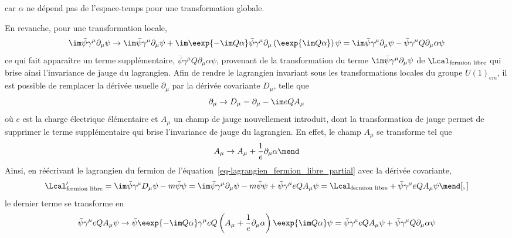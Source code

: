 car $\alpha$ ne dépend pas de l'espace-temps pour une transformation globale.
\par En revanche, pour une transformation locale, %
\begin{equation}
\im\bar{\psi} \gamma^\mu\partial_\mu \psi
\to
\im\bar{\psi} \gamma^\mu\partial_\mu \psi
+
\im\eexp{-\im Q\alpha}
\bar{\psi}
\gamma^\mu
\partial_\mu
\left(\eexp{\im Q\alpha}\vphantom{\psi\eexp{\im Q\alpha}}\right)
\psi
=
\im\bar{\psi} \gamma^\mu\partial_\mu \psi
-
\bar{\psi}
\gamma^\mu
Q\partial_\mu
\alpha
\psi
\label{eq-QED_jauge_brisee}
\end{equation}
ce qui fait apparaître un terme supplémentaire, $\bar{\psi}\gamma^\mu Q\partial_\mu\alpha\psi$, provenant de la transformation du terme $\im \bar{\psi} \gamma^\mu\partial_\mu \psi$ de $\Lcal_{\text{fermion libre}}$ qui brise ainsi l'invariance de jauge du lagrangien.
Afin de rendre le lagrangien invariant sous les transformations locales du groupe $U(1)_{em}$, il est possible de remplacer la dérivée usuelle $\partial_\mu$ par la dérivée covariante $D_\mu$, telle que
\begin{equation}
\partial_\mu \to D_\mu = \partial_\mu - \im eQ A_\mu
\end{equation}
où $e$ est la charge électrique élémentaire et $A_\mu$ un champ de jauge nouvellement introduit, dont la transformation de jauge permet de supprimer le terme supplémentaire qui brise l'invariance de jauge du lagrangien. En effet, le champ $A_\mu$ se transforme tel que
\begin{equation}
A_\mu \to A_\mu + \frac{1}{e} \partial_\mu\alpha
\mend
\end{equation}
Ainsi, en réécrivant le lagrangien du fermion de l'équation~\eqref{eq-lagrangien_fermion_libre_partial} avec la dérivée covariante,
\begin{equation}
\Lcal_{\text{fermion libre}}' = \im \bar{\psi} \gamma^\mu D_\mu \psi - m \bar{\psi}\psi
= \im \bar{\psi} \gamma^\mu\partial_\mu \psi - m \bar{\psi}\psi + \bar{\psi}\gamma^\mu eQA_\mu \psi
= \Lcal_{\text{fermion libre}} + \bar{\psi}\gamma^\mu eQA_\mu \psi
\mend[,]
\end{equation}
le dernier terme se transforme en
\begin{equation}
\bar{\psi}\gamma^\mu eQA_\mu \psi
\to
\bar{\psi}\eexp{-\im Q\alpha}
\gamma^\mu
eQ\left(A_\mu + \frac{1}{e}\partial_\mu\alpha\right)
\eexp{\im Q\alpha}\psi
=
\bar{\psi} \gamma^\mu eQA_\mu \psi
+
\bar{\psi} \gamma^\mu  Q\partial_\mu\alpha \psi
\end{equation}
